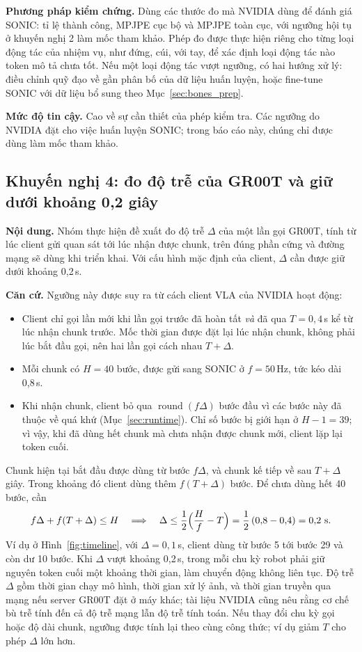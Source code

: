 \documentclass[12pt,a4paper,oneside]{report}
\begin{document}
\textbf{Phương pháp kiểm chứng.} Dùng các thước đo mà NVIDIA dùng để đánh giá SONIC: tỉ lệ thành công, MPJPE cục bộ và MPJPE toàn cục, với ngưỡng hội tụ ở khuyến nghị 2 làm mốc tham khảo. Phép đo được thực hiện riêng cho từng loại động tác của nhiệm vụ, như đứng, cúi, với tay, để xác định loại động tác nào token mô tả chưa tốt. Nếu một loại động tác vượt ngưỡng, có hai hướng xử lý: điều chỉnh quỹ đạo về gần phân bố của dữ liệu huấn luyện, hoặc fine-tune SONIC với dữ liệu bổ sung theo Mục~\ref{sec:bones_prep}.

\textbf{Mức độ tin cậy.} Cao về sự cần thiết của phép kiểm tra. Các ngưỡng do NVIDIA đặt cho việc huấn luyện SONIC; trong báo cáo này, chúng chỉ được dùng làm mốc tham khảo.

\subsection{Khuyến nghị 4: đo độ trễ của GR00T và giữ dưới khoảng 0,2 giây}
\label{sec:rec_latency}

\textbf{Nội dung.} Nhóm thực hiện đề xuất đo độ trễ $\Delta$ của một lần gọi GR00T, tính từ lúc client gửi quan sát tới lúc nhận được chunk, trên đúng phần cứng và đường mạng sẽ dùng khi triển khai. Với cấu hình mặc định của client, $\Delta$ cần được giữ dưới khoảng 0,2\,s.

\textbf{Căn cứ.} Ngưỡng này được suy ra từ cách client VLA của NVIDIA hoạt động:
\begin{itemize}
\item Client chỉ gọi lần mới khi lần gọi trước đã hoàn tất \emph{và} đã qua $T = 0{,}4$\,s kể từ lúc nhận chunk trước. Mốc thời gian được đặt lại lúc nhận chunk, không phải lúc bắt đầu gọi, nên hai lần gọi cách nhau $T + \Delta$.
\item Mỗi chunk có $H = 40$ bước, được gửi sang SONIC ở $f = 50$\,Hz, tức kéo dài 0,8\,s.
\item Khi nhận chunk, client bỏ qua $\operatorname{round}(f\Delta)$ bước đầu vì các bước này đã thuộc về quá khứ (Mục~\ref{sec:runtime}). Chỉ số bước bị giới hạn ở $H-1 = 39$; vì vậy, khi đã dùng hết chunk mà chưa nhận được chunk mới, client lặp lại token cuối.
\end{itemize}
Chunk hiện tại bắt đầu được dùng từ bước $f\Delta$, và chunk kế tiếp về sau $T + \Delta$ giây. Trong khoảng đó client dùng thêm $f(T + \Delta)$ bước. Để chưa dùng hết 40 bước, cần
\[
f\Delta + f(T + \Delta) \le H
\quad\Longrightarrow\quad
\Delta \le \frac{1}{2}\Bigl(\frac{H}{f} - T\Bigr) = \frac{1}{2}\,(0{,}8 - 0{,}4) = 0{,}2\ \text{s}.
\]
Ví dụ ở Hình~\ref{fig:timeline}, với $\Delta = 0{,}1$\,s, client dùng từ bước 5 tới bước 29 và còn dư 10 bước. Khi $\Delta$ vượt khoảng 0,2\,s, trong mỗi chu kỳ robot phải giữ nguyên token cuối một khoảng thời gian, làm chuyển động không liên tục. Độ trễ $\Delta$ gồm thời gian chạy mô hình, thời gian xử lý ảnh, và thời gian truyền qua mạng nếu server GR00T đặt ở máy khác; tài liệu NVIDIA cũng nêu rằng cơ chế bù trễ tính đến cả độ trễ mạng lẫn độ trễ tính toán. Nếu thay đổi chu kỳ gọi hoặc độ dài chunk, ngưỡng được tính lại theo cùng công thức; ví dụ giảm $T$ cho phép $\Delta$ lớn hơn.
\end{document}
